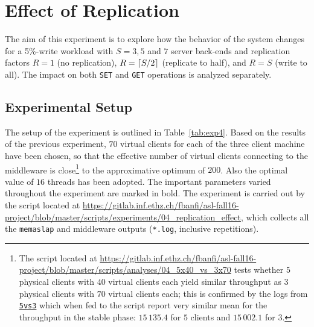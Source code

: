 \documentclass[11pt]{article}
\DeclarePairedDelimiter{\ceil}{\lceil}{\rceil}
\theoremstyle{definition}
\renewcommand\t\texttt
\begin{document}
\section{Effect of Replication}\label{sec:repl-eff}

The aim of this experiment is to explore how the behavior of the system changes for a 5\%-write workload with $S=3,5$ and $7$ server back-ends and replication factors $R=1$ (no replication), $R=\ceil{S/2}$ (replicate to half), and $R=S$ (write to all).
The impact on both \t{SET} and \t{GET} operations is analyzed separately.

\subsection{Experimental Setup}

The setup of the experiment is outlined in Table~\ref{tab:exp4}.
Based on the results of the previous experiment, $70$ virtual clients for each of the three client machine have been chosen, so that the effective number of virtual clients connecting to the middleware is close\footnote{The script located at \url{https://gitlab.inf.ethz.ch/fbanfi/asl-fall16-project/blob/master/scripts/analyses/04_5x40_vs_3x70} tests whether $5$ physical clients with $40$ virtual clients each yield similar throughput as $3$ physical clients with $70$ virtual clients each; this is confirmed by the logs from \hyperref[f:5vs3]{\t{5vs3}} which when fed to the script report very similar mean for the throughput in the stable phase: $15\,135.4$ for $5$ clients and $15\,002.1$ for $3$.} to the approximative optimum of $200$.
Also the optimal value of $16$ threads has been adopted.
The important parameters varied throughout the experiment are marked in bold.
The experiment is carried out by the script located at  \url{https://gitlab.inf.ethz.ch/fbanfi/asl-fall16-project/blob/master/scripts/experiments/04_replication_effect}, which collects all the \t{memaslap} and middleware outputs (\t{*.log}, inclusive repetitions). %
\end{document}
